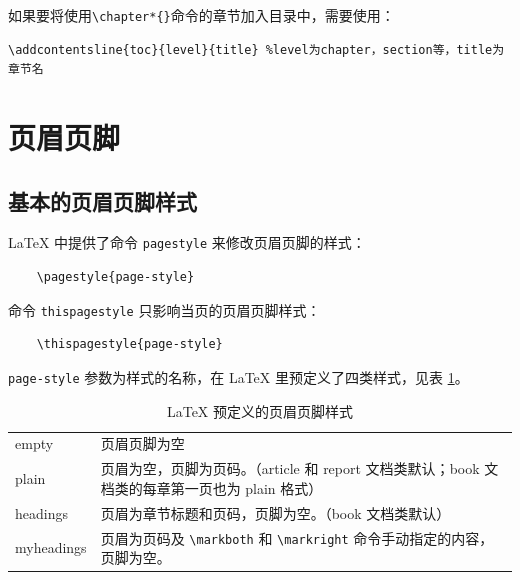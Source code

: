 如果要将使用\lstinline|\chapter*{}|命令的章节加入目录中，需要使用：
\begin{lstlisting}
\addcontentsline{toc}{level}{title} %level为chapter，section等，title为章节名
\end{lstlisting}

\section{页眉页脚}\label{sec:headerfooter}
\subsection{基本的页眉页脚样式}\label{subsec:basic}

\LaTeX{} 中提供了命令 \lstinline{pagestyle} 来修改页眉页脚的样式：
\begin{lstlisting}
    \pagestyle{page-style}
\end{lstlisting}

命令 \lstinline{thispagestyle} 只影响当页的页眉页脚样式：
\begin{lstlisting}
    \thispagestyle{page-style}
\end{lstlisting}

\lstinline{page-style} 参数为样式的名称，在 \LaTeX{} 里预定义了四类样式，见表 \ref{tbl:pagestyle}。

\begin{table}[htp]
    \centering
    \renewcommand\arraystretch{1.5}
    \caption{\LaTeX{} 预定义的页眉页脚样式}\label{tbl:pagestyle}
    \begin{tabular}{lp{30em}}
        \hline
        {empty}      & 页眉页脚为空                                                              \\
        {plain}      & 页眉为空，页脚为页码。（{article} 和 {report} 文档类默认；{book} 文档类的每章第一页也为 plain 格式） \\
        \hline
        {headings}   & 页眉为章节标题和页码，页脚为空。（{book} 文档类默认）                                      \\
        {myheadings} & 页眉为页码及 \verb|\markboth| 和 \verb|\markright| 命令手动指定的内容，页脚为空。         \\
        \hline
    \end{tabular}
\end{table}

